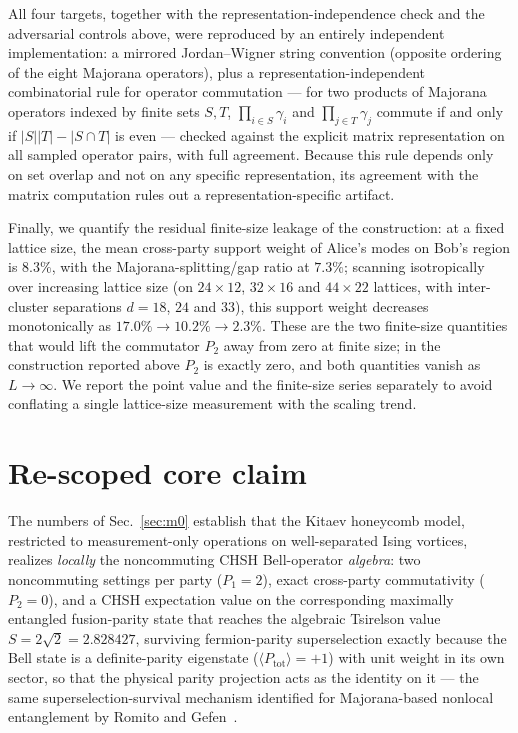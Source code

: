 \documentclass[aps,pra,twocolumn,superscriptaddress,floatfix,nofootinbib]{revtex4-2}
\begin{document}
All four targets, together with the representation-independence check
and the adversarial controls above, were reproduced by an entirely
independent implementation: a mirrored Jordan--Wigner string
convention (opposite ordering of the eight Majorana operators), plus a
representation-independent combinatorial rule for operator
commutation --- for two products of Majorana operators indexed by
finite sets $S,T$, $\prod_{i\in S}\gamma_i$ and $\prod_{j\in T}\gamma_j$
commute if and only if $|S||T|-|S\cap T|$ is even --- checked against
the explicit matrix representation on all sampled operator pairs, with
full agreement. Because this rule depends only on set overlap and not
on any specific representation, its agreement with the matrix
computation rules out a representation-specific artifact.

Finally, we quantify the residual finite-size leakage of the
construction: at a fixed lattice size, the mean cross-party
support weight of Alice's modes on Bob's region is $8.3\%$, with the
Majorana-splitting/gap ratio at $7.3\%$; scanning isotropically over
increasing lattice size (on $24\times12$, $32\times16$ and
$44\times22$ lattices, with inter-cluster separations $d=18$, $24$
and $33$), this support weight decreases monotonically as
$17.0\%\to10.2\%\to2.3\%$. These are the two finite-size quantities
that would lift the commutator $P_2$ away from zero at finite size; in
the construction reported above $P_2$ is exactly zero, and both
quantities vanish as $L\to\infty$. We report the point value and the finite-size series
separately to avoid conflating a single lattice-size measurement with
the scaling trend.

\section{Re-scoped core claim}
\label{sec:rescope}

The numbers of Sec.~\ref{sec:m0} establish that the Kitaev honeycomb
model, restricted to measurement-only operations on well-separated
Ising vortices, realizes \emph{locally} the noncommuting CHSH
Bell-operator \emph{algebra}: two noncommuting settings per party
($P_1=2$), exact cross-party commutativity ($P_2=0$), and a CHSH
expectation value on the corresponding maximally entangled fusion-parity
state that reaches the algebraic Tsirelson value
$S=2\sqrt2=2.828427$, surviving fermion-parity superselection exactly
because the Bell state is a definite-parity eigenstate
($\langle P_{\mathrm{tot}}\rangle=+1$) with unit weight in its own
sector, so that the physical parity projection acts as the identity on
it --- the same superselection-survival mechanism identified for
Majorana-based nonlocal entanglement by Romito and
Gefen~\cite{RomitoGefen2017}.
\end{document}
